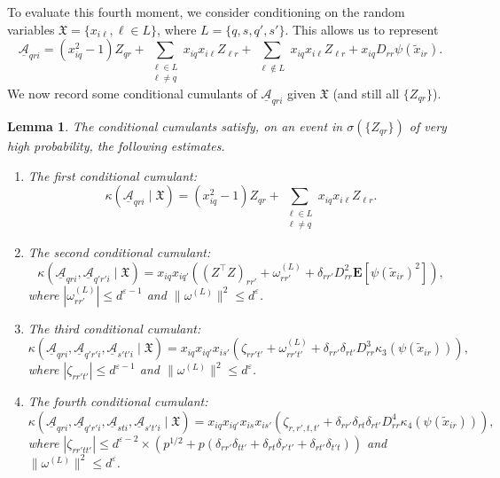 \documentclass[letterpaper, 10pt, dvipsnames]{article}
\numberwithin{equation}{section}
\newcommand{\Au}{\underline{\mathcal{A}}}
\newcommand{\wt}{\widetilde}
\newcommand{\Eb}{\mathbf{E}}
\newtheorem{lem}[ccounter]{Lemma}
\theoremstyle{definition}
\begin{document}
To evaluate this fourth moment, we consider conditioning on the random variables $\mathfrak{X} = \{ x_{i\ell}, \ell\in L\}$, where $L = \{q,s,q',s'\}$.  
This allows us to represent  
\begin{equation}\label{eq:Au-cond}
\Au_{qri} = (x_{iq}^2-1)Z_{qr} 
+ \sum_{\substack{\ell \in L\\ \ell\neq q}} x_{iq}x_{i\ell}Z_{\ell r} 
+ \sum_{\substack{\ell \notin L}} x_{iq}x_{i\ell}Z_{\ell r} 
+ x_{iq}D_{rr}\psi(\wt{x}_{ir}).
\end{equation}
We now record some conditional cumulants of $\Au_{qri}$ given $\mathfrak{X}$ (and still all $\{Z_{qr}\}$).
\begin{lem}
  The conditional cumulants satisfy, on an event in $\sigma( \{Z_{qr}\})$ of very high probability, the following estimates.
  \begin{enumerate}
    \item The first conditional cumulant:
    \begin{equation}\label{eq:first-cumulant}
    \kappa( \Au_{qri} \mid \mathfrak{X}) = (x_{iq}^2-1)Z_{qr} 
    + \sum_{\substack{\ell \in L\\ \ell\neq q}} x_{iq}x_{i\ell}Z_{\ell r}.
    \end{equation}
    \item The second conditional cumulant:
    \[
    \kappa( \Au_{qri},\Au_{q'r'i} \mid \mathfrak{X}) =
    x_{iq}x_{iq'}
    \left((
      Z^{\top} Z)_{rr'}
      + \omega^{(L)}_{rr'}
      + \delta_{r r'} D_{rr}^2\Eb[ \psi(\wt{x}_{ir})^2]
    \right),
    \]
    where $|\omega^{(L)}_{rr'}| \leq d^{\varepsilon-1}$ and $\|\omega^{(L)}\|^2 \leq d^{\varepsilon}$.
    \item The third conditional cumulant:
    \[
    \kappa( \Au_{qri},\Au_{q'r'i},\Au_{s't'i} \mid \mathfrak{X})
    = x_{iq}x_{iq'}x_{is'} \left( 
      \zeta_{rr't'} 
      + \omega^{(L)}_{rr't'}
      + \delta_{r r'}\delta_{r t'} D_{rr}^3 \kappa_3(\psi(\wt{x}_{ir}))
      \right),
    \]
    where $|\zeta_{rr't'}| \leq d^{\varepsilon-1}$ and $\|\omega^{(L)}\|^2 \leq d^{\varepsilon}$.
    \item The fourth conditional cumulant:
    \[
    \kappa( \Au_{qri},\Au_{q'r'i},\Au_{sti},\Au_{s't'i} \mid \mathfrak{X})
    = x_{iq}x_{iq'}x_{is}x_{is'} \left( \zeta_{r,r',t,t'} + \delta_{r r'}\delta_{r t} \delta_{r t'} D_{rr}^4 \kappa_4(\psi(\wt{x}_{ir}))\right),
    \]
    where $|\zeta_{rr'tt'}| \leq d^{\varepsilon-2} \times \left(
      p^{1/2} 
      + p(\delta_{r r'}\delta_{tt'} 
      + \delta_{r t}\delta_{r' t'} 
      + \delta_{r t'}\delta_{t' t})
       \right)$
    and $\|\omega^{(L)}\|^2 \leq d^{\varepsilon}$.
  \end{enumerate}
  \label{lem:conditional-cumulants}
\end{lem}
\end{document}
